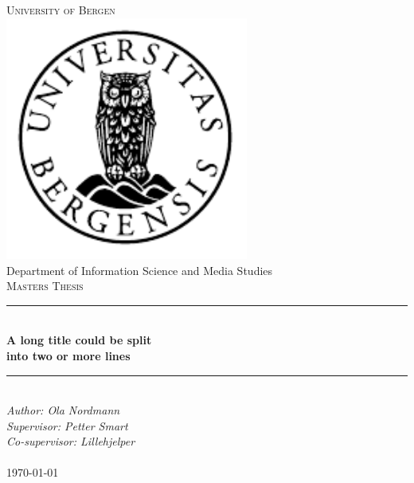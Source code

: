 \documentclass[../Main/thesis.tex]{subfiles}
\begin{document}
\newcommand{\HRule}{\rule{\linewidth}{0.5mm}}

\begin{titlepage}
\begin{center}
\textsc{\Huge University of Bergen}\\[0.4cm]
\includegraphics[width=8cm]{../Figures/uib} \\[0.5cm]

\large Department of Information Science and Media Studies\\[0.7cm]
\textsc{\huge Masters Thesis}\\[0.4cm]
\HRule \\[0.4cm]
{ \huge \bfseries A long title could be split \\into two or more lines}\\[0.5cm]
\HRule \\[1.0cm]

\emph{Author: Ola Nordmann}\\
\emph{Supervisor: Petter Smart}\\
\emph{Co-supervisor: Lillehjelper}\\

\paragraph*{}
\end{center}
\vfill
\begin{center}
{\large \today}
\end{center}
\end{titlepage}
\end{document}
